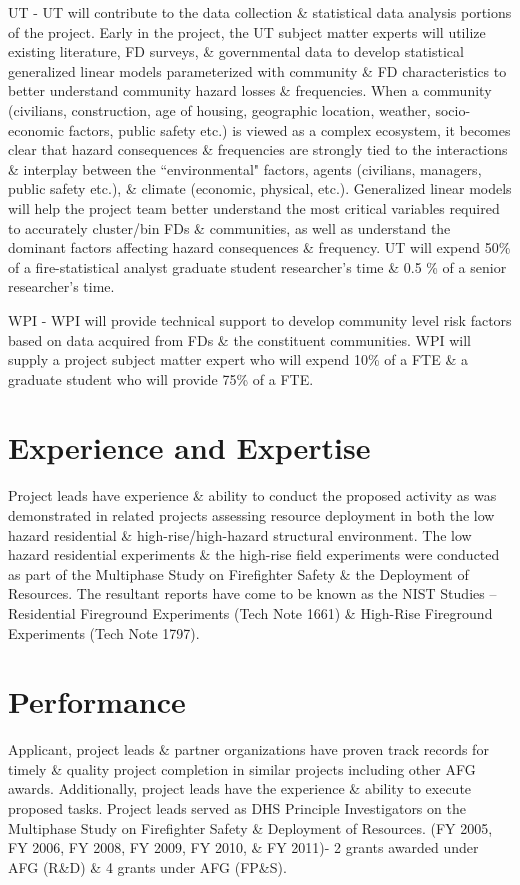 \documentclass[12pt,letterpaper]{article}
\begin{document}
UT - UT will contribute to the data collection \& statistical data analysis portions of the project. Early in the project, the UT subject matter experts will utilize existing literature, FD surveys, \& governmental data to develop statistical generalized linear models parameterized with community \& FD characteristics to better understand community hazard losses \& frequencies. When a community (civilians, construction, age of housing, geographic location, weather, socio-economic factors, public safety etc.) is viewed as a complex ecosystem, it becomes clear that hazard consequences \& frequencies are strongly tied to the interactions \& interplay between the ``environmental" factors, agents (civilians, managers, public safety etc.), \& climate (economic, physical, etc.). Generalized linear models will help the project team better understand the most critical variables required to accurately cluster/bin FDs \& communities, as well as understand the dominant factors affecting hazard consequences \& frequency. UT will expend 50\% of a fire-statistical analyst graduate student researcher's time \& 0.5 \% of a senior researcher's time.

WPI - WPI will provide technical support to develop community level risk factors based on data acquired from FDs \& the constituent communities. WPI will supply a project subject matter expert who will expend 10\% of a FTE \& a graduate student who will provide 75\% of a FTE.


\section{Experience and Expertise}
\label{sec:exp}
Project leads have experience \& ability to conduct the proposed activity as was demonstrated in related projects assessing resource deployment in both the low hazard residential \& high-rise/high-hazard structural environment.  The low hazard residential experiments \& the high-rise field experiments were conducted as part of the Multiphase Study on Firefighter Safety \& the Deployment of Resources.  The resultant reports have come to be known as the NIST Studies – Residential Fireground Experiments (Tech Note 1661) \& High-Rise Fireground Experiments (Tech Note 1797).



\section{Performance}
\label{sec:perform}
Applicant, project leads \& partner organizations have proven track records for timely \& quality project completion in similar projects including other AFG awards. Additionally, project leads have the experience \& ability to execute proposed tasks.  Project leads served as DHS Principle Investigators on the Multiphase Study on Firefighter Safety \& Deployment of Resources. (FY 2005, FY 2006, FY 2008, FY 2009, FY 2010, \& FY 2011)- 2 grants awarded under AFG (R\&D) \& 4 grants under AFG (FP\&S). 
\end{document}
